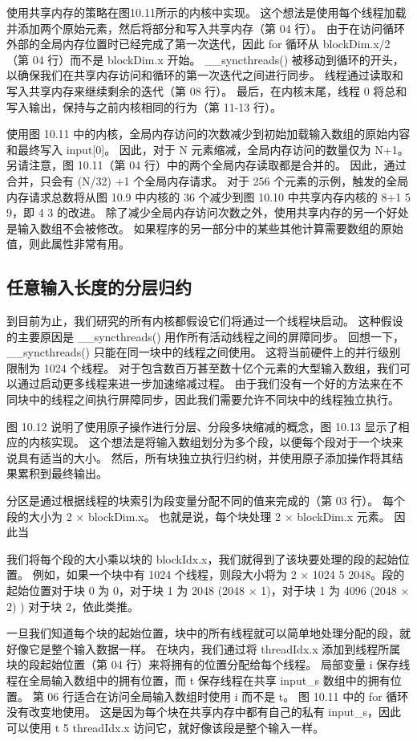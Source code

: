 使用共享内存的策略在图10.11所示的内核中实现。 这个想法是使用每个线程加载并添加两个原始元素，然后将部分和写入共享内存（第 04 行）。 由于在访问循环外部的全局内存位置时已经完成了第一次迭代，因此 for 循环从 blockDim.x/2 （第 04 行）而不是 blockDim.x 开始。 \_\_syncthreads() 被移动到循环的开头，以确保我们在共享内存访问和循环的第一次迭代之间进行同步。 线程通过读取和写入共享内存来继续剩余的迭代（第 08 行）。 最后，在内核末尾，线程 0 将总和写入输出，保持与之前内核相同的行为（第 11-13 行）。

使用图 10.11 中的内核，全局内存访问的次数减少到初始加载输入数组的原始内容和最终写入 input[0]。 因此，对于 N 元素缩减，全局内存访问的数量仅为 N+1。 另请注意，图 10.11（第 04 行）中的两个全局内存读取都是合并的。 因此，通过合并，只会有 (N/32) +1 个全局内存请求。 对于 256 个元素的示例，触发的全局内存请求总数将从图 10.9 中内核的 36 个减少到图 10.10 中共享内存内核的 8+1 5 9，即 4 3 的改进。 除了减少全局内存访问次数之外，使用共享内存的另一个好处是输入数组不会被修改。 如果程序的另一部分中的某些其他计算需要数组的原始值，则此属性非常有用。

\subsection{任意输入长度的分层归约}
到目前为止，我们研究的所有内核都假设它们将通过一个线程块启动。 这种假设的主要原因是 \_\_syncthreads() 用作所有活动线程之间的屏障同步。 回想一下，\_\_syncthreads() 只能在同一块中的线程之间使用。 这将当前硬件上的并行级别限制为 1024 个线程。 对于包含数百万甚至数十亿个元素的大型输入数组，我们可以通过启动更多线程来进一步加速缩减过程。 由于我们没有一个好的方法来在不同块中的线程之间执行屏障同步，因此我们需要允许不同块中的线程独立执行。

图 10.12 说明了使用原子操作进行分层、分段多块缩减的概念，图 10.13 显示了相应的内核实现。 这个想法是将输入数组划分为多个段，以便每个段对于一个块来说具有适当的大小。 然后，所有块独立执行归约树，并使用原子添加操作将其结果累积到最终输出。

分区是通过根据线程的块索引为段变量分配不同的值来完成的（第 03 行）。 每个段的大小为 2 × blockDim.x。 也就是说，每个块处理 2 × blockDim.x 元素。 因此当

我们将每个段的大小乘以块的 blockIdx.x，我们就得到了该块要处理的段的起始位置。 例如，如果一个块中有 1024 个线程，则段大小将为 2 × 1024 5 2048。段的起始位置对于块 0 为 0，对于块 1 为 2048 (2048 × 1)，对于块 1 为 4096 (2048 × 2) ) 对于块 2，依此类推。

一旦我们知道每个块的起始位置，块中的所有线程就可以简单地处理分配的段，就好像它是整个输入数据一样。 在块内，我们通过将 threadIdx.x 添加到线程所属块的段起始位置（第 04 行）来将拥有的位置分配给每个线程。 局部变量 i 保存线程在全局输入数组中的拥有位置，而 t 保存线程在共享 input\_s 数组中的拥有位置。 第 06 行适合在访问全局输入数组时使用 i 而不是 t。 图 10.11 中的 for 循环没有改变地使用。 这是因为每个块在共享内存中都有自己的私有 input\_s，因此可以使用 t 5 threadIdx.x 访问它，就好像该段是整个输入一样。

